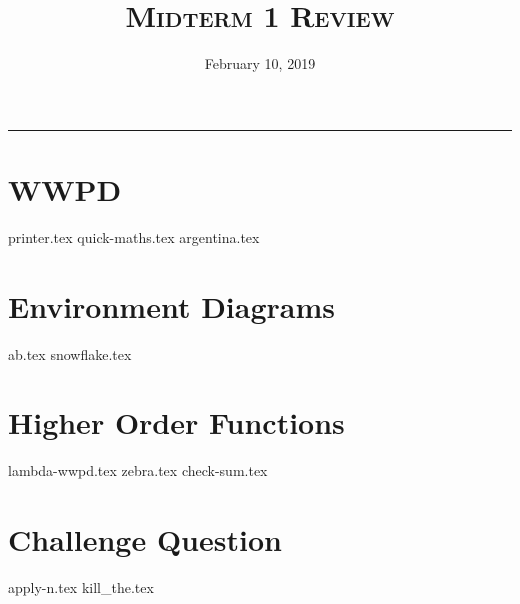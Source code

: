 \documentclass{exam}
\title{\textsc{Midterm 1 Review}}
\date{February 10, 2019}
\begin{document}
\maketitle
\rule{\textwidth}{0.15em}
\fontsize{12}{15}\selectfont


\section{WWPD}
\begin{questions}
{printer.tex}
{quick-maths.tex}
{argentina.tex}
\end{questions}

\newpage
\section{Environment Diagrams}
\begin{questions}
{ab.tex}
\newpage
{snowflake.tex}

\end{questions}

\newpage
\section{Higher Order Functions}
\begin{questions}
{lambda-wwpd.tex}
{zebra.tex}
\newpage
{check-sum.tex}
\end{questions}


\section{Challenge Question}
\begin{questions}
{apply-n.tex}
{kill_the.tex}
\end{questions}
\end{document}
